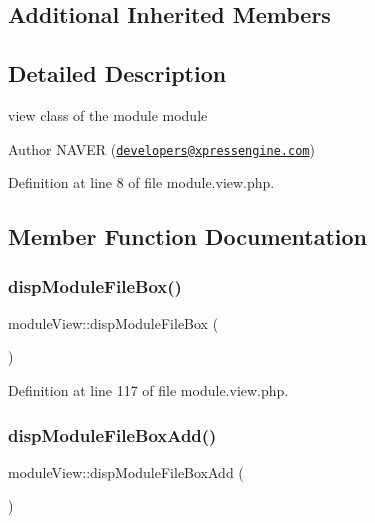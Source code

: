 \subsection*{Additional Inherited Members}


\subsection{Detailed Description}
view class of the module module 

\begin{DoxyAuthor}{Author}
N\+A\+V\+ER (\href{mailto:developers@xpressengine.com}{\tt developers@xpressengine.\+com}) 
\end{DoxyAuthor}


Definition at line 8 of file module.\+view.\+php.



\subsection{Member Function Documentation}
\mbox{\label{classmoduleView_a88b4412f774d5b2d54adfad1779a0cc5}} 
\subsubsection{\texorpdfstring{disp\+Module\+File\+Box()}{dispModuleFileBox()}}
{\footnotesize\ttfamily module\+View\+::disp\+Module\+File\+Box (\begin{DoxyParamCaption}{ }\end{DoxyParamCaption})}



Definition at line 117 of file module.\+view.\+php.

\mbox{\label{classmoduleView_acb1f66a7abc38852dd38b3d133e7f3cc}} 
\subsubsection{\texorpdfstring{disp\+Module\+File\+Box\+Add()}{dispModuleFileBoxAdd()}}
{\footnotesize\ttfamily module\+View\+::disp\+Module\+File\+Box\+Add (\begin{DoxyParamCaption}{ }\end{DoxyParamCaption})}



